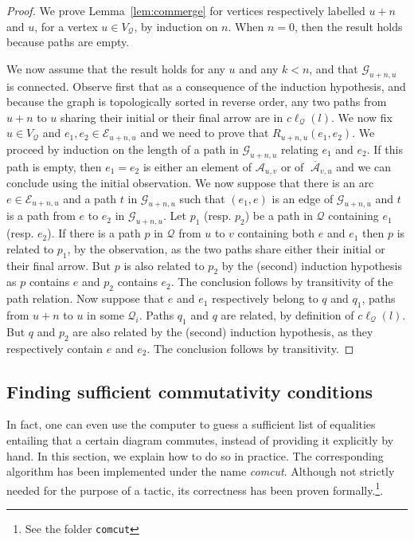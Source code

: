 \documentclass[10pt,a4paper]{article}
\renewcommand{\~}{\widetilde}
\newcommand{\G}{\mathcal G}
\newcommand{\A}{\mathcal A}
\newcommand{\Q}{\mathcal Q}
\newcommand{\E}{\mathcal E}
\newcommand{\cl}{c\ell} %
\newcommand{\arcsfrom}[1]{\A_{#1}} %
\newcommand{\arcsto}[1]{\;\overline{\!\!\A}_{#1}} %
\begin{document}
\begin{proof}
  We prove Lemma~\ref{lem:commerge} for vertices respectively labelled $u + n$ and $u$, for a vertex $u \in V_\Q$, by induction on $n$. When $n = 0$, then the result holds because paths are empty.

  We now assume that the result holds for any $u$ and any $k < n$, and that $\G_{u+n,u}$ is connected. Observe first that as a consequence of the induction hypothesis, and because the graph is  topologically sorted in reverse order, any two paths from $u + n$ to $u$ sharing their initial or their final arrow are in $\cl_\Q(l)$. We now fix $u\in V_\Q$ and $e_1, e_2 \in \E_{u+n,u}$ and we need to prove that $R_{u+n,u}(e_1, e_2)$. We proceed by induction on the length of a path in $\G_{u+n,u}$ relating $e_1$ and $e_2$. If this path is empty, then $e_1 = e_2$ is either an element of $\arcsfrom{u,v}$ or of $\arcsto{v,u}$ and we can conclude using the initial observation. We now suppose that there is an arc $e\in \E_{u+n,u}$ and a path $t$ in $\G_{u+n,u}$ such that $(e_1, e)$ is an edge of $\G_{u+n,u}$ and $t$ is a path from $e$ to $e_2$ in $\G_{u+n,u}$. Let $p_1$ (resp. $p_2$) be a path in $\Q$ containing $e_1$  (resp. $e_2$). If there is a path $p$ in $\Q$ from $u$ to $v$ containing both $e$ and $e_1$ then $p$ is related to $p_1$, by the observation, as the two paths share either their initial or their final arrow. But $p$ is also related to $p_2$ by the (second) induction hypothesis as $p$ contains $e$ and $p_2$ contains $e_2$. The conclusion follows by transitivity of the path relation. Now suppose that $e$ and $e_1$ respectively belong to $q$ and $q_1$, paths from $u+n$ to $u$ in some $\Q_i$. Paths $q_1$ and $q$ are related, by definition of $\cl_\Q(l)$. But $q$ and $p_2$ are also related by the (second) induction hypothesis, as they respectively contain $e$ and $e_2$. The conclusion follows by transitivity.
\end{proof}




\subsection{Finding sufficient commutativity conditions}\label{ssec:comcut}

In fact, one can even use the computer to guess a sufficient list of equalities entailing that a certain diagram commutes, instead of providing it explicitly by hand. In this section, we explain how to do so in practice. The corresponding algorithm has been implemented under the name \emph{comcut}. Although not strictly needed for the purpose of a tactic, its correctness has been proven formally.\footnote{See the folder \texttt{comcut}}.
\end{document}
